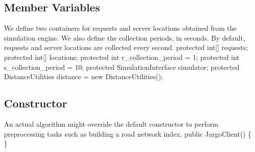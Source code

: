 \documentclass{article}
\def\nwendcode{\endtrivlist \endgroup}
\let\nwdocspar=\par
\begin{document}
\subsection{Member Variables}
We define two containers for requests and server locations obtained from the
simulation engine. We also define the collection periods, in seconds. By
default, requests and server locations are collected every second.
\nwenddocs{}\endmoddef{}
protected int[] requests;
protected int[] locations;
protected int r_collection_period = 1;
protected int s_collection_period = 10;
protected SimulationInterface simulator;
protected DistanceUtilities distance = new DistanceUtilities();
\eatline
{}\nwendcode{}\nwdocspar
\subsection{Constructor}
An actual algorithm might override the default constructor to perform
preprocessing tasks such as building a road network index.
\nwenddocs{}\endmoddef{}
public JargoClient() \{ \}
\nwendcode{}\nwdocspar
\end{document}
